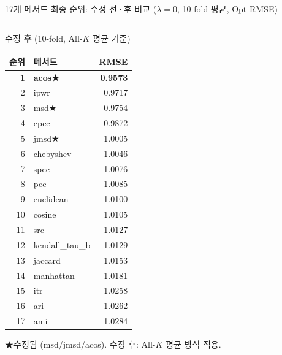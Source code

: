 \documentclass[aspectratio=169,10pt]{beamer}
\begin{document}
\begin{frame}[shrink=8]{17개 메서드 최종 순위: 수정 전·후 비교 \textnormal{\small($\lambda=0$, 10-fold 평균, Opt RMSE)}}
\begin{columns}[T]
			\begin{alertblock}{수정 \textbf{후} (10-fold, All-$K$ 평균 기준)}
				\renewcommand{\arraystretch}{1.1}
				\scriptsize
				\begin{tabular}{r|l|r}
					\toprule
					순위 & 메서드 & RMSE \\
					\midrule
					\rowcolor{testgreen!25}
					\textbf{1} & \textbf{acos\quad\textcolor{testgreen}{★}} & \textbf{0.9573} \\
					2 & ipwr     & 0.9717 \\
					\rowcolor{testgreen!10}
					3 & msd\quad\textcolor{testgreen}{★} & 0.9754 \\
					4 & cpcc     & 0.9872 \\
					\rowcolor{testgreen!10}
					5 & jmsd\quad\textcolor{testgreen}{★} & 1.0005 \\
					6 & chebyshev & 1.0046 \\
					7 & spcc     & 1.0076 \\
					8 & pcc      & 1.0085 \\
					9 & euclidean & 1.0100 \\
					10 & cosine  & 1.0105 \\
					11 & src     & 1.0127 \\
					12 & kendall\_tau\_b & 1.0129 \\
					13 & jaccard & 1.0153 \\
					14 & manhattan & 1.0181 \\
					15 & itr     & 1.0258 \\
					16 & ari     & 1.0262 \\
					17 & ami     & 1.0284 \\
					\bottomrule
				\end{tabular}
				\vspace{0.2em}
				{\tiny ★수정됨 (msd/jmsd/acos). 수정 후: All-$K$ 평균 방식 적용.}
			\end{alertblock}
	\end{columns}
\end{frame}
\end{document}
